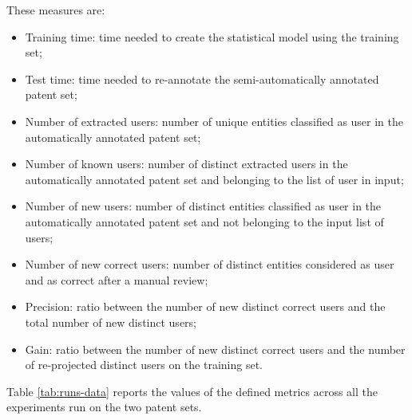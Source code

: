 \documentclass[]{book}
\providecommand{\tightlist}{%
  \setlength{\itemsep}{0pt}\setlength{\parskip}{0pt}}
\begin{document}
These measures are:

\begin{itemize}
\tightlist
\item
  Training time: time needed to create the statistical model using the
  training set;
\item
  Test time: time needed to re-annotate the semi-automatically annotated
  patent set;
\item
  Number of extracted users: number of unique entities classified as
  user in the automatically annotated patent set;
\item
  Number of known users: number of distinct extracted users in the
  automatically annotated patent set and belonging to the list of user
  in input;
\item
  Number of new users: number of distinct entities classified as user in
  the automatically annotated patent set and not belonging to the input
  list of users;
\item
  Number of new correct users: number of distinct entities considered as
  user and as correct after a manual review;
\item
  Precision: ratio between the number of new distinct correct users and
  the total number of new distinct users;
\item
  Gain: ratio between the number of new distinct correct users and the
  number of re-projected distinct users on the training set.
\end{itemize}

Table \ref{tab:runs-data} reports the values of the defined metrics
across all the experiments run on the two patent sets.
\end{document}
